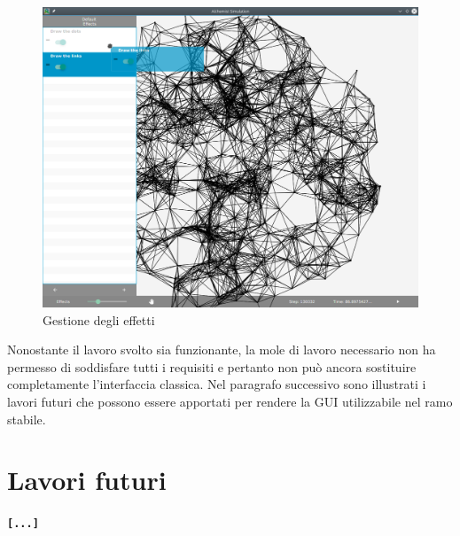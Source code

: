         \begin{figure}[htbp]
            \centering
            \includegraphics[scale=0.45]{img/withNodes/simWithDnD}
            \caption{Gestione  degli effetti}
            \label{fig:simWithDnD}
        \end{figure}

        Nonostante il lavoro svolto sia funzionante, la mole di lavoro necessario non ha permesso di soddisfare tutti i requisiti e pertanto non può ancora sostituire completamente l'interfaccia classica. Nel paragrafo successivo sono illustrati i lavori futuri che possono essere apportati per rendere la GUI utilizzabile nel ramo stabile.

    \section{Lavori futuri}\label{sec:futuro}
        \textbf{\texttt{[...]}}
